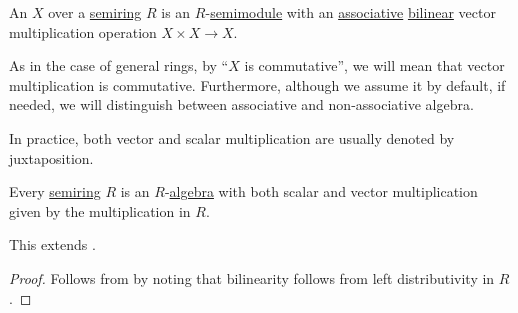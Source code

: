 \begin{definition}\label{def:algebra_over_semiring}\mimprovised
  An  \( X \) over a \hyperref[def:semiring]{semiring} \( R \) is an \( R \)-\hyperref[def:semimodule]{semimodule} with an \hyperref[def:magma/associative]{associative} \hyperref[def:multilinear_function]{bilinear} vector multiplication operation \( X \times X \to X \).

  As in the case of general rings, by \enquote{\( X \) is commutative}, we will mean that vector multiplication is commutative. Furthermore, although we assume it by default, if needed, we will distinguish between associative and non-associative algebra.

  In practice, both vector and scalar multiplication are usually denoted by juxtaposition.
\end{definition}

\begin{proposition}\label{thm:semiring_is_algebra}
  Every \hyperref[def:semiring]{semiring} \( R \) is an \( R \)-\hyperref[def:algebra_over_semiring]{algebra} with both scalar and vector multiplication given by the multiplication in \( R \).

  This extends .
\end{proposition}
\begin{proof}
  Follows from  by noting that bilinearity follows from left distributivity in \( R \).
\end{proof}

